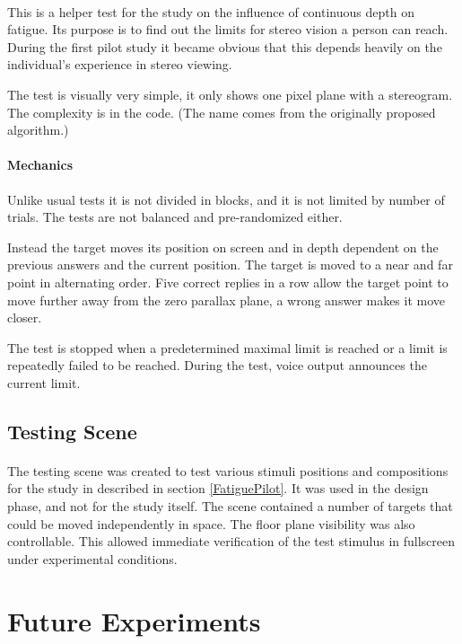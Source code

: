 \paragraph{}
This is a helper test for the study on the influence of continuous depth on fatigue.
Its purpose is to find out the limits for stereo vision a person can reach.
During the first pilot study it became obvious that this depends heavily on the individual's experience in stereo viewing.

The test is visually very simple, it only shows one pixel plane with a stereogram.
The complexity is in the code.
(The name comes from the originally proposed algorithm.)

\paragraph{Mechanics}
Unlike usual tests it is not divided in blocks, and it is not limited by number of trials.
The tests are not balanced and pre-randomized either.

Instead the target moves its position on screen and in depth dependent on the previous answers and the current position.
The target is moved to a near and far point in alternating order.
Five correct replies in a row allow the target point to move further away from the zero parallax plane,
a wrong answer makes it move closer.

The test is stopped when a predetermined maximal limit is reached or a limit is repeatedly failed to be reached.
During the test, voice output announces the current limit.

\subsection{Testing Scene}
\paragraph{}
The testing scene was created to test various stimuli positions and compositions for the study in described in section \ref{FatiguePilot}.
It was used in the design phase, and not for the study itself.
The scene contained a number of targets that could be moved independently in space.
The floor plane visibility was also controllable.
This allowed immediate verification of the test stimulus in fullscreen under experimental conditions.


\section{Future Experiments}
